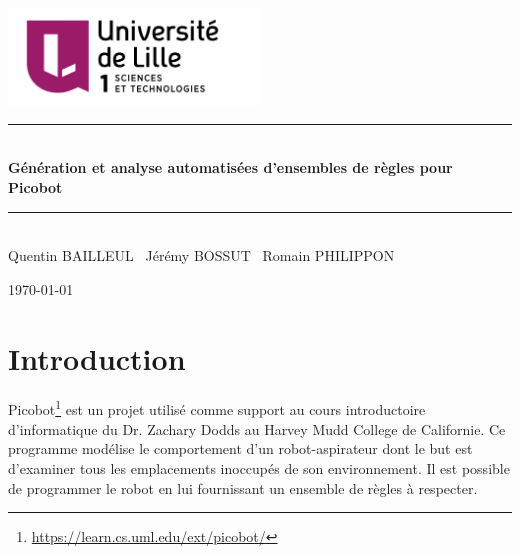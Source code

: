 \documentclass{article}
\newcommand{\HRule}{\rule{\linewidth}{0.5mm}}
\begin{document}


\begin{titlepage}
\begin{center}

\includegraphics[width=0.5\textwidth]{pictures/ul.png}~\\[1cm]

\HRule \\[0.2cm]
{ \huge \bfseries Génération et analyse automatisées d’ensembles de règles pour Picobot \\[0.4cm] }

\HRule \\[1.5cm]
Quentin BAILLEUL \  Jérémy BOSSUT \  Romain PHILIPPON

\vfill

{\large \today}

\end{center}
\end{titlepage}

\newpage
\tableofcontents

\newpage

\section{Introduction}

Picobot\footnote{\label{pico_lien}\url{https://learn.cs.uml.edu/ext/picobot/}} est un projet utilisé comme support au cours introductoire d'informatique du Dr. Zachary Dodds au Harvey Mudd College de Californie. Ce programme modélise le comportement d’un robot-aspirateur dont le but est d’examiner tous les emplacements inoccupés de son environnement. Il est possible de programmer le robot en lui fournissant un ensemble de règles à respecter.
\\
\end{document}
